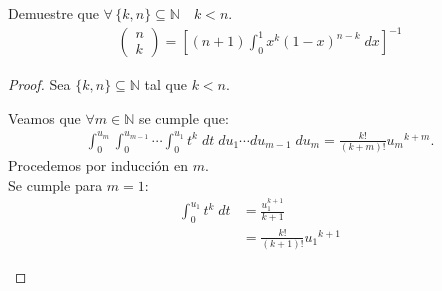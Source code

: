 \documentclass[11pt]{article}
\numberwithin{equation}{section}
\newcommand{\N}{\mathbb{N}}
\begin{document}
\begin{Problema}[1]{}
    Demuestre que $\forall\,\{k,n\}\subseteq\N\quad k< n$.
    \begin{align*}
         \begin{pmatrix}
            n\\
            k
         \end{pmatrix}
         =\left[(n+1)\int_{0}^{1}x^k(1-x)^{n-k}\;dx\right]^{-1}
    \end{align*}
\end{Problema}
\begin{proof}
    Sea $\{k,n\}\subseteq\N$ tal que $k<n$.\\
    \begin{box1}
    Veamos que $\forall m\in\N$ se cumple que:
    \begin{align*}
        \int_{0}^{u_m}\int_{0}^{u_{m-1}}\cdots\int_{0}^{u_1}t^k\;dt\;du_1\cdots du_{m-1}\;du_m=\frac{k!}{(k+m)!}{u_m}^{k+m}.
    \end{align*}
    Procedemos por inducción en $m$.\\[10pt]
    Se cumple para $m=1$:
    \begin{align*}
        \int_{0}^{u_1}t^k\;dt&=\frac{u_1^{k+1}}{k+1}\\
        &=\frac{k!}{(k+1)!}{u_1}^{k+1}
    \end{align*}


\end{box1}
\end{proof}
\end{document}
